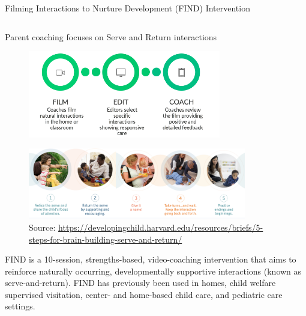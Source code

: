 \documentclass[final]{beamer}
\begin{document}
\begin{frame}[t]
\begin{columns}[t]
\begin{column}{\textwidth}
  \vspace{-15pt}
  \begin{block}{Filming Interactions to Nurture Development (FIND) Intervention}
    \begin{columns}[t]
      \begin{column}{0.48\textwidth}
          \begin{block}{Parent coaching focuses on Serve and Return interactions}
        \begin{figure}[ht]
          \centering
          \includegraphics[clip, width=0.75\textwidth]{find.png}
          \label{fig:find}
        \end{figure}
        \vspace{-1cm}
        \begin{figure}[ht]
          \centering
          \includegraphics[clip, width=0.85\textwidth]{servereturn.png}
          \label{fig:servereturn}
          \\[0.5em]
          \vspace{-0.5cm}
          {\tiny Source: \url{https://developingchild.harvard.edu/resources/briefs/5-steps-for-brain-building-serve-and-return/}}
        \label{fig:servereturn}
       \end{figure}
             \end{block}
        \vspace{-0.5cm}
        FIND is a 10-session, strengths-based, video-coaching intervention that aims to reinforce naturally occurring, developmentally supportive interactions (known as serve-and-return). FIND has previously been used in homes, child welfare supervised visitation, center- and home-based child care, and pediatric care settings.


\end{column}
\end{columns}
\end{block}
\end{column}
\end{columns}
\end{frame}
\end{document}
